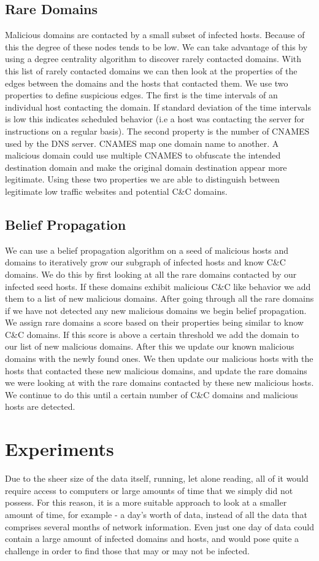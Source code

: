 \documentclass{article} %
\begin{document}
\subsection{Rare Domains}
Malicious domains are contacted by a small subset of infected hosts. Because of this the degree of these nodes tends to be low. We can take advantage of this by using a degree centrality algorithm to discover rarely contacted domains. With this list of rarely contacted domains we can then look at the properties of the edges between the domains and the hosts that contacted them. We use two properties to define suspicious edges. The first is the time intervals of an individual host contacting the domain. If standard deviation of the time intervals is low this indicates scheduled behavior (i.e a host was contacting the server for instructions on a regular basis). The second property is the number of CNAMES used by the DNS server. CNAMES map one domain name to another. A malicious domain could use multiple CNAMES to obfuscate the intended destination domain and make the original domain destination appear more legitimate. Using these two properties we are able to distinguish between legitimate low traffic websites and potential C\&C domains.

\subsection{Belief Propagation}
We can use a belief propagation algorithm on a seed of malicious hosts and domains to iteratively grow our subgraph of infected hosts and know C\&C domains. We do this by first looking at all the rare domains contacted by our infected seed hosts. If these domains exhibit malicious C\&C like behavior we add them to a list of new malicious domains. After going through all the rare domains if we have not detected any new malicious domains we begin belief propagation. We assign rare domains a score based on their properties being similar to know C\&C domains. If this score is above a certain threshold we add the domain to our list of new malicious domains. After this we update our known malicious domains with the newly found ones. We then update our malicious hosts with the hosts that contacted these new malicious domains, and update the rare domains we were looking at with the rare domains contacted by these new malicious hosts. We continue to do this until a certain number of C\&C domains and malicious hosts are detected.

\section{Experiments}
\label{exp}
Due to the sheer size of the data itself, running, let alone reading, all of it would require access to computers or large amounts of time that we simply did not possess. For this reason, it is a more suitable approach to 
look at a smaller amount of time, for example - a day's worth of data, instead of all the data that comprises several months of network information. Even just one day of data could contain a large amount of infected domains 
and hosts, and would pose quite a challenge in order to find those that may or may not be infected.
\end{document}
